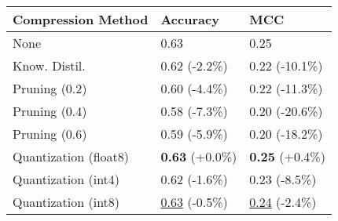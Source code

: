 \begin{tabular}{lll}
\toprule
\textbf{Compression Method} & \textbf{Accuracy} & \textbf{MCC} \\
\midrule
None & 0.63 & 0.25 \\
Know. Distil. & 0.62 (-2.2\%) & 0.22 (-10.1\%) \\
Pruning (0.2) & 0.60 (-4.4\%) & 0.22 (-11.3\%) \\
Pruning (0.4) & 0.58 (-7.3\%) & 0.20 (-20.6\%) \\
Pruning (0.6) & 0.59 (-5.9\%) & 0.20 (-18.2\%) \\
Quantization (float8) & \textbf{0.63} (+0.0\%) & \textbf{0.25} (+0.4\%) \\
Quantization (int4) & 0.62 (-1.6\%) & 0.23 (-8.5\%) \\
Quantization (int8) & \underline{0.63} (-0.5\%) & \underline{0.24} (-2.4\%) \\
\bottomrule
\end{tabular}
